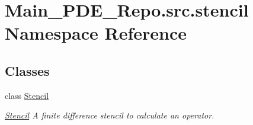 \hypertarget{namespaceMain__PDE__Repo_1_1src_1_1stencil}{}\section{Main\+\_\+\+P\+D\+E\+\_\+\+Repo.\+src.\+stencil Namespace Reference}
\label{namespaceMain__PDE__Repo_1_1src_1_1stencil}
\subsection*{Classes}
\begin{DoxyCompactItemize}
\item 
class \hyperlink{classMain__PDE__Repo_1_1src_1_1stencil_1_1Stencil}{Stencil}
\begin{DoxyCompactList}\small\item\em \hyperlink{classMain__PDE__Repo_1_1src_1_1stencil_1_1Stencil}{Stencil} A finite difference stencil to calculate an operator. \end{DoxyCompactList}\end{DoxyCompactItemize}
